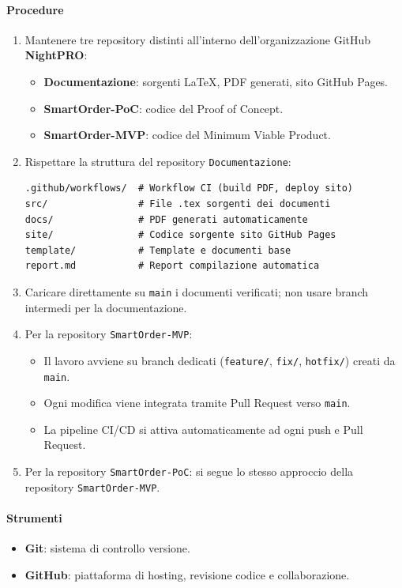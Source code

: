 \documentclass[a4paper, 11pt, oneside]{scrartcl}
\begin{document}
\paragraph{Procedure}
\begin{enumerate}
    \item Mantenere tre repository distinti all'interno dell'organizzazione GitHub \textbf{NightPRO}:
          \begin{itemize}
              \item \textbf{Documentazione}: sorgenti \LaTeX{}, PDF generati, sito GitHub Pages.
              \item \textbf{SmartOrder-PoC}: codice del Proof of Concept.
              \item \textbf{SmartOrder-MVP}: codice del Minimum Viable Product.
          \end{itemize}
    \item Rispettare la struttura del repository \texttt{Documentazione}:
          \begin{verbatim}
.github/workflows/  # Workflow CI (build PDF, deploy sito)
src/                # File .tex sorgenti dei documenti
docs/               # PDF generati automaticamente
site/               # Codice sorgente sito GitHub Pages
template/           # Template e documenti base
report.md           # Report compilazione automatica
\end{verbatim}
    \item Caricare direttamente su \texttt{main} i documenti verificati; non usare branch intermedi per la documentazione.
    \item Per la repository \texttt{SmartOrder-MVP}:
    \begin{itemize}
        \item Il lavoro avviene su branch dedicati (\texttt{feature/}, \texttt{fix/}, \texttt{hotfix/}) creati da \texttt{main}.
        \item Ogni modifica viene integrata tramite Pull Request verso \texttt{main}.
        \item La pipeline CI/CD si attiva automaticamente ad ogni push e Pull Request.
    \end{itemize}
    \item Per la repository \texttt{SmartOrder-PoC}: si segue lo stesso approccio della repository \texttt{SmartOrder-MVP}.
\end{enumerate}

\paragraph{Strumenti}
\begin{itemize}
    \item \textbf{Git}: sistema di controllo versione.
    \item \textbf{GitHub}: piattaforma di hosting, revisione codice e collaborazione.
\end{itemize}
\end{document}
